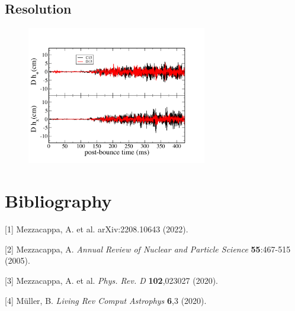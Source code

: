 \documentclass[aspectratio=169]{beamer}
\begin{document}
\subsection{Resolution}

\begin{frame}

  \begin{figure}
    \includegraphics[width=0.7\textwidth]{Figures/C15_D15_rh_Zaxis.pdf}
  \end{figure}

\end{frame}

\section{Bibliography}

\begin{frame}

  [1] Mezzacappa, A. et al.
      arXiv:2208.10643 (2022).\newline

  [2] Mezzacappa, A.
      \textit{Annual Review of Nuclear and Particle Science}
      \textbf{55}:467-515 (2005).\newline

  [3] Mezzacappa, A. et al.
      \textit{Phys. Rev. D}
      \textbf{102},023027 (2020).\newline

  [4] M{\"u}ller, B. \textit{Living Rev Comput Astrophys}
      \textbf{6},3 (2020).

\end{frame}

\end{document}
